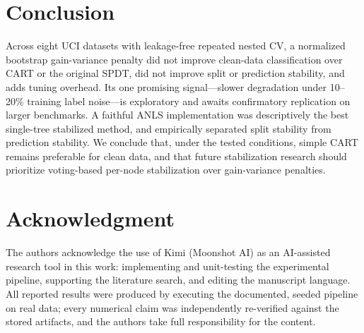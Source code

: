 \documentclass[conference]{IEEEtran}
\begin{document}
\section{Conclusion}
Across eight UCI datasets with leakage-free repeated nested CV, a
normalized bootstrap gain-variance penalty did not improve clean-data
classification over CART or the original SPDT, did not improve split or
prediction stability, and adds tuning overhead. Its one promising
signal---slower degradation under 10--20\% training label noise---is
exploratory and awaits confirmatory replication on larger benchmarks.
A faithful ANLS implementation was descriptively the best single-tree
stabilized method, and empirically separated split stability from
prediction stability. We conclude that, under the tested conditions,
simple CART remains preferable for clean data, and that future
stabilization research should prioritize voting-based per-node
stabilization over gain-variance penalties.

\section*{Acknowledgment}
The authors acknowledge the use of Kimi (Moonshot AI) as an AI-assisted
research tool in this work: implementing and unit-testing the
experimental pipeline, supporting the literature search, and editing the
manuscript language. All reported results were produced by executing
the documented, seeded pipeline on real data; every numerical claim was
independently re-verified against the stored artifacts, and the authors
take full responsibility for the content.



\end{document}
